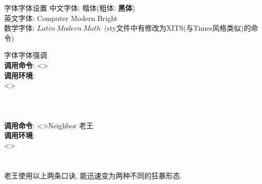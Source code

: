 \documentclass[hyperref, UTF8, CJK, aspectratio=169]{beamer}
\begin{document}
\begin{frame}{字体}{字体设置}
  中文字体: 楷体(粗体: \textbf{黑体})\\
  英文字体: Computer Modern Bright\\
  数学字体: $Latin\ Modern\ Math$~(sty文件中有修改为XITS(与Times风格类似)的命令)\\
\end{frame}

\begin{frame}{字体}{字体强调}
  \\
  
  \textbf{调用命令}: \textcolor{scugrey}{<>}\hfill{}\\
  \textbf{调用环境}:\\
  \textcolor{scugrey}{<>}\\
  \hspace*{1em}\\
  \\[2ex]
  
  \\
  
  \textbf{调用命令}: \textcolor{scugrey}{<>}\hfill\alert{Neighbor 老王}\\
  \textbf{调用环境}:\\
  \textcolor{scugrey}{<>}\\
  \hspace*{1em}\\
  \\
  
  老王使用以上两条口诀, 能迅速变为两种不同的狂暴形态.
\end{frame}
\end{document}
